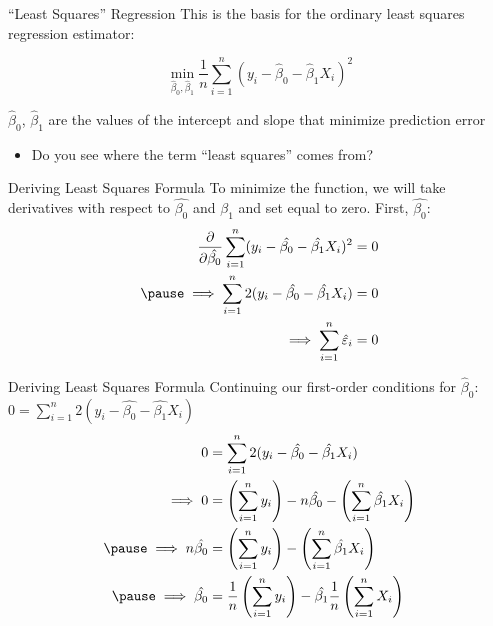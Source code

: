 \documentclass[aspectratio=169,t,11pt,table]{beamer}
\begin{document}

\begin{frame}{``Least Squares'' Regression}
  This is the basis for the \alert{ordinary least squares} regression estimator:

  $$
    \min_{\hat{\beta}_0, \hat{\beta}_1} \frac{1}{n} \sum_{i=1}^n (y_i - \hat{\beta}_0 - \hat{\beta}_1 X_i)^2
  $$

  \pause
  \bigskip
  $\hat{\beta}_0$, $\hat{\beta}_1$ are the values of the intercept and slope that minimize prediction error
  \begin{itemize}
    \item Do you see where the term ``least squares'' comes from?
  \end{itemize}
\end{frame}

\begin{frame}{Deriving Least Squares Formula}
  To minimize the function, we will take derivatives with respect to $\hat{\beta_0}$ and $\hat{\beta_1}$ and set equal to zero. First, $\hat{\beta_0}$:
  \begin{align*}
    \frac{\partial}{\partial \hat{\beta_0}} \sum_{i=1}^n (y_i - \hat{\beta_0} - \hat{\beta_1} X_i)^2 &= 0 \\
    \pause
    \implies \sum_{i=1}^n 2 (y_i - \hat{\beta_0} - \hat{\beta_1} X_i) &= 0 \\
    \implies \sum_{i=1}^n \hat{\varepsilon}_i &= 0
  \end{align*}
\end{frame}

\begin{frame}{Deriving Least Squares Formula}
  Continuing our first-order conditions for $\hat{\beta}_0$: $0 = \sum_{i=1}^n 2 (y_i - \hat{\beta_0} - \hat{\beta_1} X_i)$
  \begin{align*}
    0 &= \sum_{i=1}^n 2 (y_i - \hat{\beta_0} - \hat{\beta_1} X_i) \\
    \implies 0 &= \left(\sum_{i=1}^n y_i \right) - n \hat{\beta_0} - \left( \sum_{i=1}^n \hat{\beta_1} X_i \right) \\ 
    \pause
    \implies n \hat{\beta_0} &= \left(\sum_{i=1}^n y_i \right) - \left( \sum_{i=1}^n \hat{\beta_1} X_i \right) \\ 
    \pause
    \implies \hat{\beta_0} &= \frac{1}{n} \left(\sum_{i=1}^n y_i \right) - \hat{\beta_1} \frac{1}{n} \left( \sum_{i=1}^n X_i \right) \\ 
  \end{align*}
\end{frame}
\end{document}
